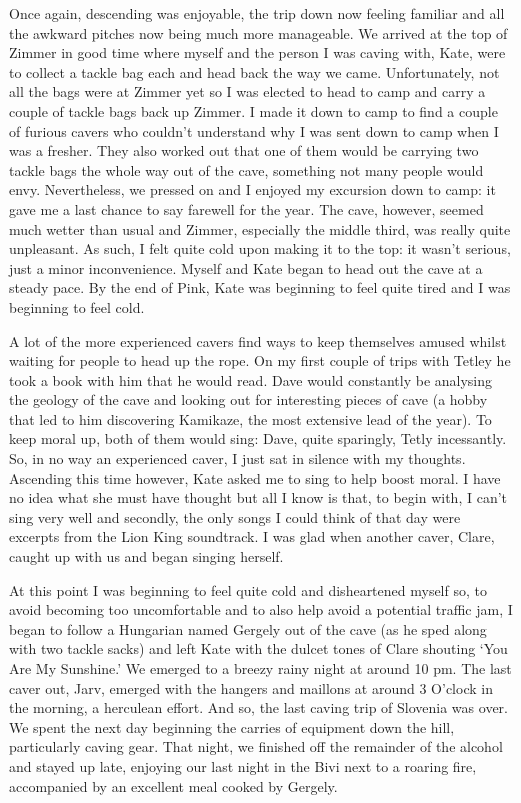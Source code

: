 Once again, descending was enjoyable, the trip down now feeling familiar
and all the awkward pitches now being much more manageable. We arrived
at the top of Zimmer in good time where myself and the person I was
caving with, Kate, were to collect a tackle bag each and head back the
way we came. Unfortunately, not all the bags were at Zimmer yet so I was
elected to head to camp and carry a couple of tackle bags back up
Zimmer. I made it down to camp to find a couple of furious cavers who
couldn't understand why I was sent down to camp when I was a fresher.
They also worked out that one of them would be carrying two tackle bags
the whole way out of the cave, something not many people would envy.
Nevertheless, we pressed on and I enjoyed my excursion down to camp: it
gave me a last chance to say farewell for the year. The cave, however,
seemed much wetter than usual and Zimmer, especially the middle third,
was really quite unpleasant. As such, I felt quite cold upon making it
to the top: it wasn't serious, just a minor inconvenience. Myself and
Kate began to head out the cave at a steady pace. By the end of Pink,
Kate was beginning to feel quite tired and I was beginning to feel cold.

A lot of the more experienced cavers find ways to keep themselves amused
whilst waiting for people to head up the rope. On my first couple of
trips with Tetley he took a book with him that he would read. Dave would
constantly be analysing the geology of the cave and looking out for
interesting pieces of cave (a hobby that led to him discovering
Kamikaze, the most extensive lead of the year). To keep moral up, both
of them would sing: Dave, quite sparingly, Tetly incessantly. So, in no
way an experienced caver, I just sat in silence with my thoughts.
Ascending this time however, Kate asked me to sing to help boost moral.
I have no idea what she must have thought but all I know is that, to
begin with, I can't sing very well and secondly, the only songs I could
think of that day were excerpts from the Lion King soundtrack. I was
glad when another caver, Clare, caught up with us and began singing
herself.

At this point I was beginning to feel quite cold and disheartened myself
so, to avoid becoming too uncomfortable and to also help avoid a
potential traffic jam, I began to follow a Hungarian named Gergely out
of the cave (as he sped along with two tackle sacks) and left Kate with
the dulcet tones of Clare shouting `You Are My Sunshine.' We emerged to
a breezy rainy night at around 10 pm. The last caver out, Jarv, emerged
with the hangers and maillons at around 3 O'clock in the morning, a
herculean effort. And so, the last caving trip of Slovenia was over. We
spent the next day beginning the carries of equipment down the hill,
particularly caving gear. That night, we finished off the remainder of
the alcohol and stayed up late, enjoying our last night in the Bivi next
to a roaring fire, accompanied by an excellent meal cooked by Gergely.

